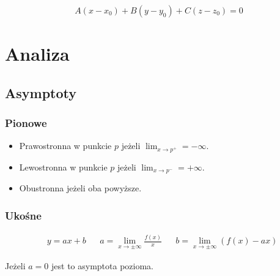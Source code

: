 \documentclass[11pt]{article}
\begin{document}
$$A(x - x_{0}) + B(y-y_{0}) + C(z - z_{0}) = 0$$
\section{Analiza}
\label{sec:org6ade12a}
\subsection{Asymptoty}
\label{sec:org0073234}
\subsubsection{Pionowe}
\label{sec:org32ff780}
\begin{itemize}
\item Prawostronna w punkcie \(p\)
jeżeli \(\lim_{x \to p^+} = - \infty\).
\item Lewostronna w punkcie \(p\)
jeżeli \(\lim_{x \to p^-} = + \infty\).
\item Obustronna  jeżeli oba powyższe.
\end{itemize}
\subsubsection{Ukośne}
\label{sec:orgab29641}
\begin{latex}
\begin{align*}
  & y = ax +b
  && a = \lim_{x \to \pm \infty} \frac{f(x)}{x}
  && b = \lim_{x \to \pm \infty } \left( f(x) -ax \right)
\end{align*}
\end{latex}
Jeżeli \(a = 0\) jest to asymptota pozioma.
\end{document}
